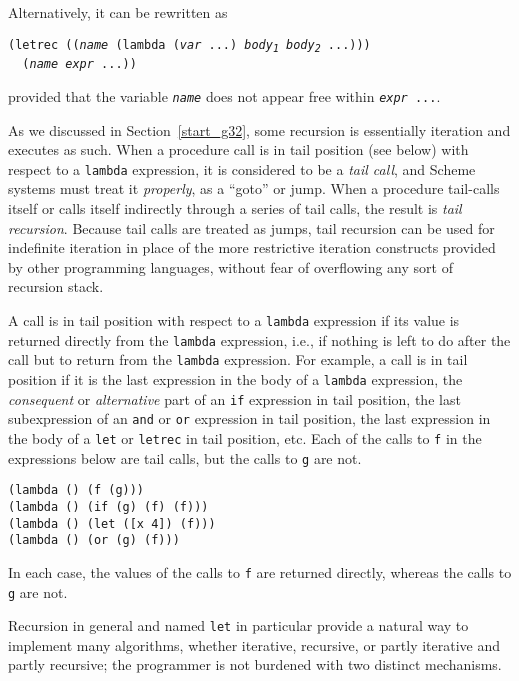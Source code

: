 Alternatively, it can be rewritten as


\begin{alltt}
(letrec ((\textit{name} (lambda (\textit{var} ...) \textit{body\textsubscript{1}} \textit{body\textsubscript{2}} ...)))
  (\textit{name} \textit{expr} ...))
\end{alltt}


provided that the variable \texttt{\textit{name}} does not appear free within
\texttt{\textit{expr} ...}.


As we discussed in Section \ref{start_g32}, some recursion is
essentially \label{further_s43}iteration and executes as such.
When a procedure call is in tail position (see below) with respect to
a \texttt{lambda}
expression, it is considered to be a \label{further_s44}\textit{tail call}, and
Scheme systems must treat it \textit{properly}, as a ``goto''
or jump.
When a procedure tail-calls itself or calls itself indirectly
through a series of tail calls, the result is \label{further_s45}\textit{tail recursion}.
Because tail calls are treated as jumps, tail recursion can be used
for indefinite iteration in place of the more restrictive iteration
constructs provided by other programming languages, without fear of
overflowing any sort of recursion stack.


A call is in tail position with respect to a \texttt{lambda} expression
if its value is returned directly from the \texttt{lambda} expression,
i.e., if nothing is left to do after the call but to return from the
\texttt{lambda} expression.
For example, a call is in tail position if
it is the last expression in the body of a \texttt{lambda} expression,
the \textit{consequent} or \textit{alternative} part of an \texttt{if} expression
in tail position,
the last subexpression of an \texttt{and} or \texttt{or} expression in tail
position,
the last expression in the body of a \texttt{let} or \texttt{letrec}
in tail position, etc.
Each of the calls to \texttt{f} in the expressions below
are tail calls, but the calls to \texttt{g} are not.


\begin{alltt}
(lambda () (f (g)))
(lambda () (if (g) (f) (f)))
(lambda () (let ([x 4]) (f)))
(lambda () (or (g) (f)))
\end{alltt}


In each case, the values of the calls to \texttt{f} are returned directly,
whereas the calls to \texttt{g} are not.


Recursion in general and named \texttt{let} in particular provide a natural
way to implement many algorithms, whether iterative, recursive, or
partly iterative and partly recursive; the programmer is not burdened
with two distinct mechanisms.


